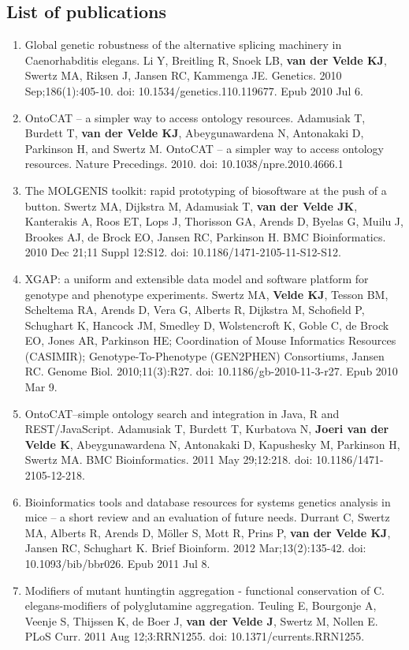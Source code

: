 \begin{appendices}
\chapter{List of publications}

\begin{enumerate}
\item Global genetic robustness of the alternative splicing machinery in Caenorhabditis elegans. Li Y, Breitling R, Snoek LB, \textbf{van der Velde KJ}, Swertz MA, Riksen J, Jansen RC, Kammenga JE. Genetics. 2010 Sep;186(1):405-10. doi: 10.1534/genetics.110.119677. Epub 2010 Jul 6.
\item OntoCAT – a simpler way to access ontology resources. Adamusiak T, Burdett T, \textbf{van der Velde KJ}, Abeygunawardena N, Antonakaki D, Parkinson H, and Swertz M. OntoCAT – a simpler way to access ontology resources. Nature Precedings. 2010. doi: 10.1038/npre.2010.4666.1
\item The MOLGENIS toolkit: rapid prototyping of biosoftware at the push of a button. Swertz MA, Dijkstra M, Adamusiak T, \textbf{van der Velde JK}, Kanterakis A, Roos ET, Lops J, Thorisson GA, Arends D, Byelas G, Muilu J, Brookes AJ, de Brock EO, Jansen RC, Parkinson H. BMC Bioinformatics. 2010 Dec 21;11 Suppl 12:S12. doi: 10.1186/1471-2105-11-S12-S12.
\item XGAP: a uniform and extensible data model and software platform for genotype and phenotype experiments. Swertz MA,  \textbf{Velde KJ}, Tesson BM, Scheltema RA, Arends D, Vera G, Alberts R, Dijkstra M, Schofield P, Schughart K, Hancock JM, Smedley D, Wolstencroft K, Goble C, de Brock EO, Jones AR, Parkinson HE; Coordination of Mouse Informatics Resources (CASIMIR); Genotype-To-Phenotype (GEN2PHEN) Consortiums, Jansen RC. Genome Biol. 2010;11(3):R27. doi: 10.1186/gb-2010-11-3-r27. Epub 2010 Mar 9.
\item OntoCAT--simple ontology search and integration in Java, R and REST/JavaScript. Adamusiak T, Burdett T, Kurbatova N, \textbf{Joeri van der Velde K}, Abeygunawardena N, Antonakaki D, Kapushesky M, Parkinson H, Swertz MA. BMC Bioinformatics. 2011 May 29;12:218. doi: 10.1186/1471-2105-12-218.
\item Bioinformatics tools and database resources for systems genetics analysis in mice – a short review and an evaluation of future needs. Durrant C, Swertz MA, Alberts R, Arends D, Möller S, Mott R, Prins P, \textbf{van der Velde KJ}, Jansen RC, Schughart K. Brief Bioinform. 2012 Mar;13(2):135-42. doi: 10.1093/bib/bbr026. Epub 2011 Jul 8.
\item Modifiers of mutant huntingtin aggregation - functional conservation of C. elegans-modifiers of polyglutamine aggregation. Teuling E, Bourgonje A, Veenje S, Thijssen K, de Boer J, \textbf{van der Velde J}, Swertz M, Nollen E. PLoS Curr. 2011 Aug 12;3:RRN1255. doi: 10.1371/currents.RRN1255.

\end{enumerate}
\end{appendices}
